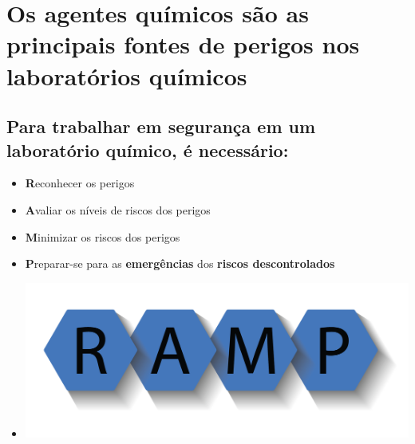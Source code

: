 \documentclass[
  letterpaper,
  DIV=11,
  numbers=noendperiod]{scrartcl}
\providecommand{\tightlist}{%
  \setlength{\itemsep}{0pt}\setlength{\parskip}{0pt}}\usepackage{longtable,booktabs,array}
\begin{document}
\section{\texorpdfstring{Os \textbf{agentes químicos} são as principais
\textbf{fontes de perigos} nos laboratórios
químicos}{Os agentes químicos são as principais fontes de perigos nos laboratórios químicos}}\label{os-agentes-quuxedmicos-suxe3o-as-principais-fontes-de-perigos-nos-laboratuxf3rios-quuxedmicos}

\subsection{Para trabalhar em segurança em um laboratório químico, é
necessário:}\label{para-trabalhar-em-seguranuxe7a-em-um-laboratuxf3rio-quuxedmico-uxe9-necessuxe1rio}

\begin{itemize}
\tightlist
\item
  \textbf{R}econhecer os perigos
\end{itemize}

\begin{itemize}
\tightlist
\item
  \textbf{A}valiar os níveis de riscos dos perigos
\end{itemize}

\begin{itemize}
\tightlist
\item
  \textbf{M}inimizar os riscos dos perigos
\end{itemize}

\begin{itemize}
\tightlist
\item
  \textbf{P}reparar-se para as \textbf{emergências} dos \textbf{riscos
  descontrolados}
\end{itemize}

\begin{itemize}
\tightlist
\item
  \includegraphics[width=6.25in,height=\textheight,keepaspectratio]{imagens/RAMP.png}
\end{itemize}
\end{document}
